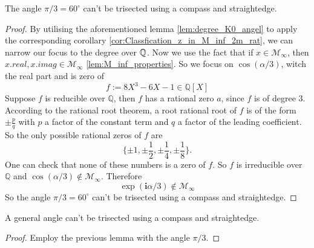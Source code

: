 \begin{lemma}
    \label{lem:pi_third_not_in_M_inf}
    \leanok
    The angle $\pi / 3 = 60^{\circ}$ can't be trisected using a compass and straightedge.
\end{lemma}
\begin{proof}
    By utilising the aforementioned lemma \ref{lem:degree_K0_angel} to apply the corresponding corollary \ref{cor:Classfication_z_in_M_inf_2m_rat}, we can narrow our focus to the degree over $\mathbb{Q}$.
    Now we use the fact that if $x\in \mathcal{M}_{\infty}$, then $x.real, x.imag \in \mathcal{M}_{\infty}$ \ref{lem:M_inf_properties}. So we focus on $\cos(\alpha/3)$, witch the real part and is zero of
    \begin{equation*}
        f := 8 X^3 - 6 X - 1 \in \mathbb{Q}[X]
    \end{equation*}
    Suppose $f$ is reducible over $\mathbb{Q}$, then $f$ has a rational zero $a$, since $f$ is of degree $3$. According to the rational root theorem, a root rational root of $f$ is of the form $\pm \frac{p}{q}$ with $p$ a factor of the constant term and $q$ a factor of the leading coefficient. So the only possible rational zeros of $f$ are
     \begin{equation*}
        \{ \pm 1, \pm \frac{1}{2}, \pm \frac{1}{4}, \pm \frac{1}{8} \}.
     \end{equation*}
     One can check that none of these numbers is a zero of $f$.
     So $f$ is irreducible over $\mathbb{Q}$ and $\cos(\alpha/3) \notin \mathcal{M}_{\infty}$.
     Therefore
        \begin{equation*}
            \exp(\textbf{i} \alpha/3) \notin \mathcal{M}_{\infty}
        \end{equation*}
    So the angle $\pi / 3 = 60^{\circ}$ can't be trisected using a compass and straightedge.
\end{proof}

\begin{theorem}
    \label{thm:Angle_not_Trisectable}
    \leanok
    A general angle can't be trisected using a compass and straightedge.
\end{theorem}
\begin{proof}
    \leanok
    Employ the previous lemma with the angle $\pi / 3$.
\end{proof}